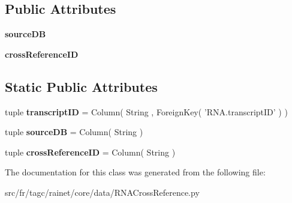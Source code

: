 \subsection*{Public Attributes}
\begin{DoxyCompactItemize}
\item 
\hypertarget{classsrc_1_1fr_1_1tagc_1_1rainet_1_1core_1_1data_1_1RNACrossReference_1_1RNACrossReference_ab806d4d65cb81490522a2ab331629609}{{\bfseries source\-D\-B}}\label{classsrc_1_1fr_1_1tagc_1_1rainet_1_1core_1_1data_1_1RNACrossReference_1_1RNACrossReference_ab806d4d65cb81490522a2ab331629609}

\item 
\hypertarget{classsrc_1_1fr_1_1tagc_1_1rainet_1_1core_1_1data_1_1RNACrossReference_1_1RNACrossReference_a4ff103455ed840702afd55ac3d4ae983}{{\bfseries cross\-Reference\-I\-D}}\label{classsrc_1_1fr_1_1tagc_1_1rainet_1_1core_1_1data_1_1RNACrossReference_1_1RNACrossReference_a4ff103455ed840702afd55ac3d4ae983}

\end{DoxyCompactItemize}
\subsection*{Static Public Attributes}
\begin{DoxyCompactItemize}
\item 
\hypertarget{classsrc_1_1fr_1_1tagc_1_1rainet_1_1core_1_1data_1_1RNACrossReference_1_1RNACrossReference_ad5c8f9cca739f13f1b7104a26165855a}{tuple {\bfseries transcript\-I\-D} = Column( String , Foreign\-Key( 'R\-N\-A.\-transcript\-I\-D' ) )}\label{classsrc_1_1fr_1_1tagc_1_1rainet_1_1core_1_1data_1_1RNACrossReference_1_1RNACrossReference_ad5c8f9cca739f13f1b7104a26165855a}

\item 
\hypertarget{classsrc_1_1fr_1_1tagc_1_1rainet_1_1core_1_1data_1_1RNACrossReference_1_1RNACrossReference_a35c440b21224cc56f8db210836ba7896}{tuple {\bfseries source\-D\-B} = Column( String )}\label{classsrc_1_1fr_1_1tagc_1_1rainet_1_1core_1_1data_1_1RNACrossReference_1_1RNACrossReference_a35c440b21224cc56f8db210836ba7896}

\item 
\hypertarget{classsrc_1_1fr_1_1tagc_1_1rainet_1_1core_1_1data_1_1RNACrossReference_1_1RNACrossReference_afbb90d0092ba54b3ab21ba6a493543eb}{tuple {\bfseries cross\-Reference\-I\-D} = Column( String )}\label{classsrc_1_1fr_1_1tagc_1_1rainet_1_1core_1_1data_1_1RNACrossReference_1_1RNACrossReference_afbb90d0092ba54b3ab21ba6a493543eb}

\end{DoxyCompactItemize}


The documentation for this class was generated from the following file\-:\begin{DoxyCompactItemize}
\item 
src/fr/tagc/rainet/core/data/R\-N\-A\-Cross\-Reference.\-py\end{DoxyCompactItemize}
